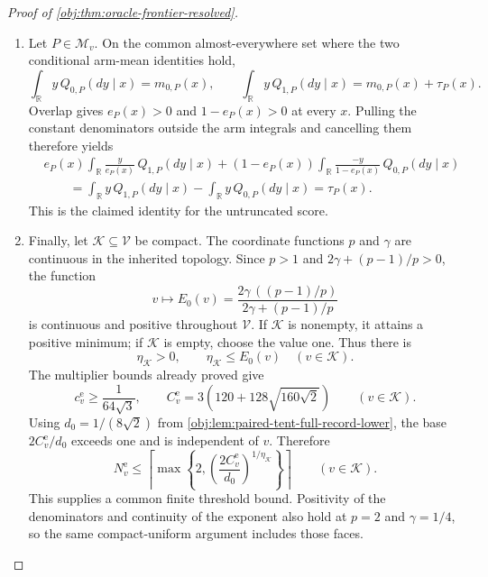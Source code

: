 \documentclass[11pt]{article}
\begin{document}
\begin{proof}[Proof of \cref{obj:thm:oracle-frontier-resolved}]
\begin{enumerate}
\item Let \(P\in\mathcal M_v\). On the common almost-everywhere set where the two conditional arm-mean identities hold,
\[
\int_{\mathbb R}y\,Q_{0,P}(dy\mid x)=m_{0,P}(x),
\qquad
\int_{\mathbb R}y\,Q_{1,P}(dy\mid x)=m_{0,P}(x)+\tau_P(x).
\]
Overlap gives \(e_P(x)>0\) and \(1-e_P(x)>0\) at every \(x\). Pulling the constant denominators outside the arm integrals and cancelling them therefore yields
\[
\begin{aligned}
&e_P(x)\int_{\mathbb R}\frac{y}{e_P(x)}\,Q_{1,P}(dy\mid x)
+(1-e_P(x))
\int_{\mathbb R}\frac{-y}{1-e_P(x)}\,Q_{0,P}(dy\mid x)\\
&\qquad=
\int_{\mathbb R}y\,Q_{1,P}(dy\mid x)
-\int_{\mathbb R}y\,Q_{0,P}(dy\mid x)
=\tau_P(x).
\end{aligned}
\]
This is the claimed identity for the untruncated score.

\item Finally, let \(\mathcal K\subseteq\mathcal V\) be compact. The coordinate functions \(p\) and \(\gamma\) are continuous in the inherited topology. Since \(p>1\) and \(2\gamma+(p-1)/p>0\), the function
\[
v\longmapsto
E_0(v)=
\frac{2\gamma\,((p-1)/p)}
{2\gamma+(p-1)/p}
\]
is continuous and positive throughout \(\mathcal V\). If \(\mathcal K\) is nonempty, it attains a positive minimum; if \(\mathcal K\) is empty, choose the value one. Thus there is
\[
\eta_{\mathcal K}>0,
\qquad
\eta_{\mathcal K}\le E_0(v)\quad(v\in\mathcal K).
\]
The multiplier bounds already proved give
\[
c^{\mathrm e}_v\ge\frac1{64\sqrt3},
\qquad
C^{\mathrm e}_v=3\left(120+128\sqrt{160\sqrt2}\right)
\qquad(v\in\mathcal K).
\]
Using \(d_0=1/(8\sqrt2)\) from \cref{obj:lem:paired-tent-full-record-lower}, the base \(2C^{\mathrm e}_v/d_0\) exceeds one and is independent of \(v\). Therefore
\[
N^{\mathrm e}_v
\le
\left\lceil
\max\left\{
2,\left(\frac{2C^{\mathrm e}_v}{d_0}\right)^{1/\eta_{\mathcal K}}
\right\}
\right\rceil
\qquad(v\in\mathcal K).
\]
This supplies a common finite threshold bound. Positivity of the denominators and continuity of the exponent also hold at \(p=2\) and \(\gamma=1/4\), so the same compact-uniform argument includes those faces.
\end{enumerate}
\end{proof}
\end{document}
